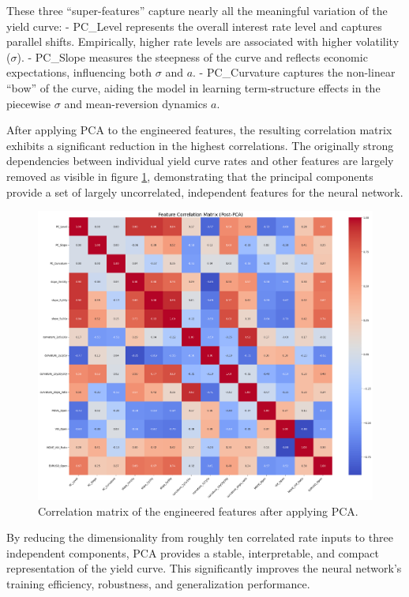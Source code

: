 {These three “super-features” capture nearly all the meaningful variation of the yield curve:
- PC\_Level represents the overall interest rate level and captures parallel shifts. Empirically, higher rate levels are associated with higher volatility (\(\sigma\)).
- PC\_Slope measures the steepness of the curve and reflects economic expectations, influencing both \(\sigma\) and \(a\).
- PC\_Curvature captures the non-linear “bow” of the curve, aiding the model in learning term-structure effects in the piecewise \(\sigma\) and mean-reversion dynamics \(a\).

After applying PCA to the engineered features, the resulting correlation matrix exhibits a significant reduction in the highest correlations. The originally strong dependencies between individual yield curve rates and other features are largely removed as visible in figure \ref{fig:feature_correlation_postPCA}, demonstrating that the principal components provide a set of largely uncorrelated, independent features for the neural network.

\begin{figure}[H]
	\centering
	\includegraphics[width=1\textwidth]{images/features/feature_correlation_matrixPost-PCA.png}
	\caption{Correlation matrix of the engineered features after applying PCA.}
	\label{fig:feature_correlation_postPCA}
\end{figure}

By reducing the dimensionality from roughly ten correlated rate inputs to three independent components, PCA provides a stable, interpretable, and compact representation of the yield curve. This significantly improves the neural network’s training efficiency, robustness, and generalization performance.

}
